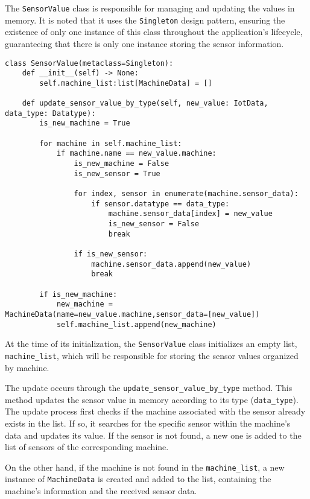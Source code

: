 The \texttt{SensorValue} class is responsible for managing and updating the values in memory. It is noted that it uses the \texttt{Singleton} design pattern, ensuring the existence of only one instance of this class throughout the application's lifecycle, guaranteeing that there is only one instance storing the sensor information.

\begin{verbatim}
class SensorValue(metaclass=Singleton):
    def __init__(self) -> None:
        self.machine_list:list[MachineData] = []

    def update_sensor_value_by_type(self, new_value: IotData, data_type: Datatype):
        is_new_machine = True

        for machine in self.machine_list:
            if machine.name == new_value.machine:
                is_new_machine = False
                is_new_sensor = True

                for index, sensor in enumerate(machine.sensor_data):
                    if sensor.datatype == data_type:
                        machine.sensor_data[index] = new_value
                        is_new_sensor = False
                        break

                if is_new_sensor:
                    machine.sensor_data.append(new_value)
                    break

        if is_new_machine:
            new_machine = MachineData(name=new_value.machine,sensor_data=[new_value])
            self.machine_list.append(new_machine)
\end{verbatim}

At the time of its initialization, the \texttt{SensorValue} class initializes an empty list, \texttt{machine\_list}, which will be responsible for storing the sensor values organized by machine.

The update occurs through the \texttt{update\_sensor\_value\_by\_type} method. This method updates the sensor value in memory according to its type (\texttt{data\_type}). The update process first checks if the machine associated with the sensor already exists in the list. If so, it searches for the specific sensor within the machine's data and updates its value. If the sensor is not found, a new one is added to the list of sensors of the corresponding machine.

On the other hand, if the machine is not found in the \texttt{machine\_list}, a new instance of \texttt{MachineData} is created and added to the list, containing the machine's information and the received sensor data.

